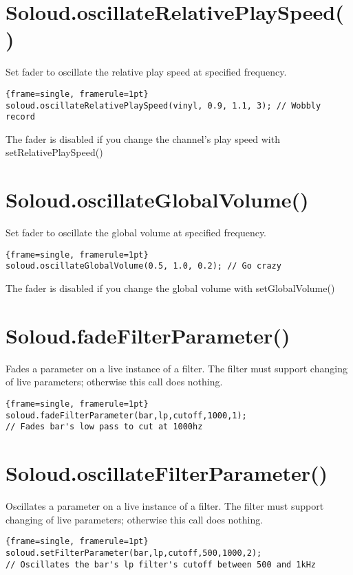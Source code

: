 \section{Soloud.oscillateRelativePlaySpeed()}
Set fader to oscillate the relative play speed at specified frequency.

\begin{lstlisting}{frame=single, framerule=1pt}
soloud.oscillateRelativePlaySpeed(vinyl, 0.9, 1.1, 3); // Wobbly record
\end{lstlisting}

The fader is disabled if you change the channel's play speed with setRelativePlaySpeed()

\section{Soloud.oscillateGlobalVolume()}
Set fader to oscillate the global volume at specified frequency.

\begin{lstlisting}{frame=single, framerule=1pt}
soloud.oscillateGlobalVolume(0.5, 1.0, 0.2); // Go crazy
\end{lstlisting}

The fader is disabled if you change the global volume with setGlobalVolume()

\section{Soloud.fadeFilterParameter()}

Fades a parameter on a live instance of a filter. The filter must support changing of live parameters; otherwise this call does nothing.

\begin{lstlisting}{frame=single, framerule=1pt}
soloud.fadeFilterParameter(bar,lp,cutoff,1000,1); 
// Fades bar's low pass to cut at 1000hz
\end{lstlisting}

\section{Soloud.oscillateFilterParameter()}
Oscillates a parameter on a live instance of a filter. The filter must support changing of live parameters; otherwise this call does nothing.

\begin{lstlisting}{frame=single, framerule=1pt}
soloud.setFilterParameter(bar,lp,cutoff,500,1000,2); 
// Oscillates the bar's lp filter's cutoff between 500 and 1kHz
\end{lstlisting}

